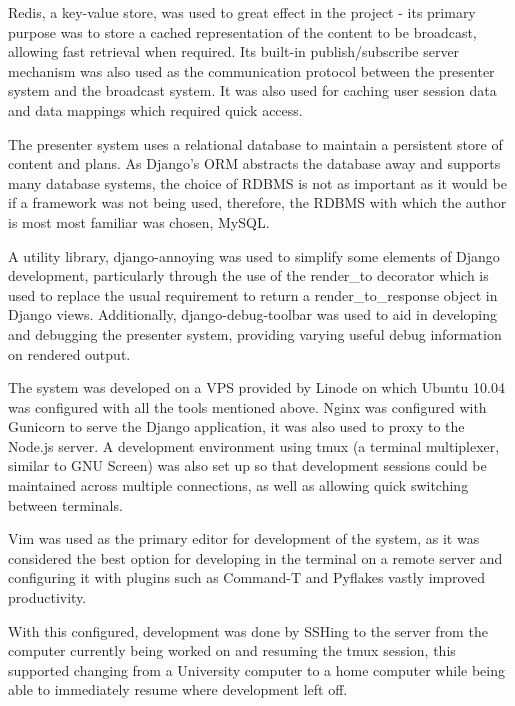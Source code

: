 \documentclass[a4papert,11pt,notitlepage]{ltxdoc}
\begin{document}
Redis\cite{redis:web}, a key-value store, was used to great effect in the project - its primary purpose was to store a cached representation of the content to be broadcast, allowing fast retrieval when required. Its built-in publish/subscribe server mechanism was also used as the communication protocol between the presenter system and the broadcast system. It was also used for caching user session data and data mappings which required quick access.

The presenter system uses a relational database to maintain a persistent store of content and plans. As Django's ORM abstracts the database away and supports many database systems, the choice of RDBMS is not as important as it would be if a framework was not being used, therefore, the RDBMS with which the author is most most familiar was chosen, MySQL\cite{mysql:web}.

A utility library, django-annoying\cite{djangoannoying:web} was used to simplify some elements of Django development, particularly through the use of the render\_to decorator which is used to replace the usual requirement to return a render\_to\_response object in Django views. Additionally, django-debug-toolbar\cite{debugtoolbar:web} was used to aid in developing and debugging the presenter system, providing varying useful debug information on rendered output.

The system was developed on a VPS provided by Linode on which Ubuntu 10.04 was configured with all the tools mentioned above. Nginx\cite{nginx:web} was configured with Gunicorn\cite{gunicorn:web} to serve the Django application, it was also used to proxy to the Node.js server. A development environment using tmux\cite{tmux:web} (a terminal multiplexer, similar to GNU Screen) was also set up so that development sessions could be maintained across multiple connections, as well as allowing quick switching between terminals.

Vim\cite{vim:web} was used as the primary editor for development of the system, as it was considered the best option for developing in the terminal on a remote server and configuring it with plugins such as Command-T and Pyflakes vastly improved productivity.

With this configured, development was done by SSHing to the server from the computer currently being worked on and resuming the tmux session, this supported changing from a University computer to a home computer while being able to immediately resume where development left off.
\end{document}
